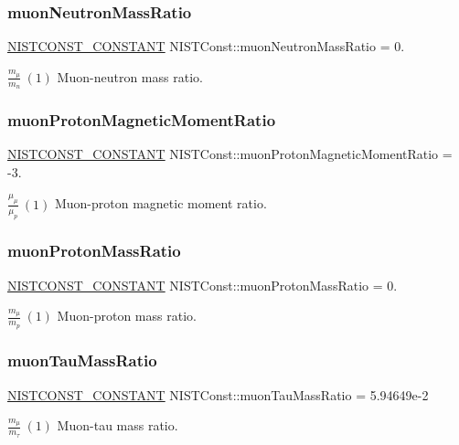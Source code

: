 \subsubsection{\texorpdfstring{muon\+Neutron\+Mass\+Ratio}{muonNeutronMassRatio}}
{\footnotesize\ttfamily \mbox{\hyperlink{group___n_i_s_t_const-_macros_ga2b0fc1d7452373f816175dd86ce26729}{N\+I\+S\+T\+C\+O\+N\+S\+T\+\_\+\+C\+O\+N\+S\+T\+A\+NT}} N\+I\+S\+T\+Const\+::muon\+Neutron\+Mass\+Ratio = 0.}

$\frac{m_\mu}{m_n} \ (1)$ Muon-\/neutron mass ratio. \mbox{\label{group___n_i_s_t_const-_muon_ga535321fb921425b92d4f09870b6b500b}} 
\subsubsection{\texorpdfstring{muon\+Proton\+Magnetic\+Moment\+Ratio}{muonProtonMagneticMomentRatio}}
{\footnotesize\ttfamily \mbox{\hyperlink{group___n_i_s_t_const-_macros_ga2b0fc1d7452373f816175dd86ce26729}{N\+I\+S\+T\+C\+O\+N\+S\+T\+\_\+\+C\+O\+N\+S\+T\+A\+NT}} N\+I\+S\+T\+Const\+::muon\+Proton\+Magnetic\+Moment\+Ratio = -\/3.}

$\frac{\mu_\mu}{\mu_p} \ (1)$ Muon-\/proton magnetic moment ratio. \mbox{\label{group___n_i_s_t_const-_muon_gaaaab6090c4f02dd57bacde06a8113ae8}} 
\subsubsection{\texorpdfstring{muon\+Proton\+Mass\+Ratio}{muonProtonMassRatio}}
{\footnotesize\ttfamily \mbox{\hyperlink{group___n_i_s_t_const-_macros_ga2b0fc1d7452373f816175dd86ce26729}{N\+I\+S\+T\+C\+O\+N\+S\+T\+\_\+\+C\+O\+N\+S\+T\+A\+NT}} N\+I\+S\+T\+Const\+::muon\+Proton\+Mass\+Ratio = 0.}

$\frac{m_\mu}{m_p} \ (1)$ Muon-\/proton mass ratio. \mbox{\label{group___n_i_s_t_const-_muon_ga2429d4c7a129833cea3e1f94959c541c}} 
\subsubsection{\texorpdfstring{muon\+Tau\+Mass\+Ratio}{muonTauMassRatio}}
{\footnotesize\ttfamily \mbox{\hyperlink{group___n_i_s_t_const-_macros_ga2b0fc1d7452373f816175dd86ce26729}{N\+I\+S\+T\+C\+O\+N\+S\+T\+\_\+\+C\+O\+N\+S\+T\+A\+NT}} N\+I\+S\+T\+Const\+::muon\+Tau\+Mass\+Ratio = 5.\+94649e-\/2}

$\frac{m_\mu}{m_\tau} \ (1)$ Muon-\/tau mass ratio. 